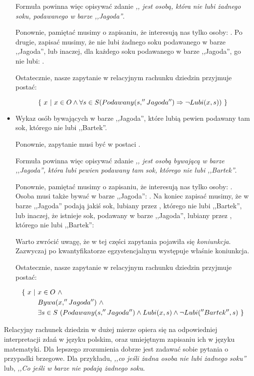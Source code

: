 \begin{example}
\begin{itemize}
    Formuła \m{\varphi} powinna więc opisywać zdanie \textit{,, jest osobą, która nie lubi żadnego soku, podawanego w barze ,,Jagoda''}.
    
    Ponownie, pamiętać musimy o zapisaniu, że interesują nas tylko osoby: . Po drugie, zapisać musimy, że  nie lubi żadnego soku podawanego w barze ,,Jagoda'', lub inaczej, dla każdego soku podawanego w barze ,,Jagoda'',  go nie lubi: .
    
    Ostatecznie, nasze zapytanie w relacyjnym rachunku dziedzin przyjmuje postać:

    \[
        \{\ x\ |\ x \in O \wedge \forall{s \in S} ( Podawany(s,''Jagoda'') \Rightarrow \neg Lubi(x,s))\ \}
    \]
    
    \item Wykaz osób bywających w barze ,,Jagoda'', które lubią pewien podawany tam sok, którego nie lubi ,,Bartek''.
    
    Ponownie, zapytanie musi być w postaci .
    
    Formuła \m{\varphi} powinna więc opisywać zdanie \textit{,, jest osobą bywającą w barze ,,Jagoda'', która lubi pewien podawany tam sok, którego nie lubi ,,Bartek''}.
    
    Ponownie, pamiętać musimy o zapisaniu, że interesują nas tylko osoby: . Osoba  musi także bywać w barze ,,Jagoda'': . Na koniec zapisać musimy, że w barze ,,Jagoda'' podają jakiś sok, lubiany przez , którego nie lubi ,,Bartek'', lub inaczej, że istnieje sok, podawany w barze ,,Jagoda'', lubiany przez , którego nie lubi ,,Bartek'': 
    
    
    Warto zwrócić uwagę, że w tej części zapytania pojawiła się \textit{koniunkcja}. Zazwyczaj po kwantyfikatorze egzystencjalnym występuje właśnie koniunkcja.
    
    Ostatecznie, nasze zapytanie w relacyjnym rachunku dziedzin przyjmuje postać:
    
    \[
        \begin{split}
            \{\ x\ |\ &x \in O\ \wedge\\ 
            &Bywa(x,''Jagoda'')\ \wedge\\
            &\exists{s \in S}\ (Podawany(s,''Jagoda'') \wedge Lubi(x,s) \wedge \neg Lubi(''Bartek'',s)\ \}
        \end{split}
    \]
    
\end{itemize}

Relacyjny rachunek dziedzin w dużej mierze opiera się na odpowiedniej interpretacji zdań w języku polskim, oraz umiejętnym zapisaniu ich w języku matematyki. Dla lepszego zrozumienia dobrze jest zadawać sobie pytania o przypadki brzegowe. Dla przykładu, \textit{,,co jeśli żadna osoba nie lubi żadnego soku''} lub, \textit{,,Co jeśli w barze  nie podają żadnego soku}.
\end{example}

